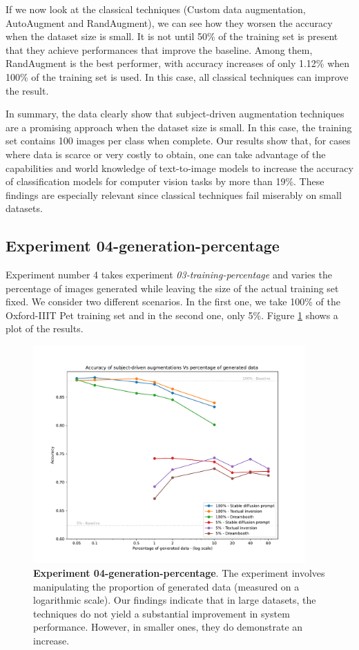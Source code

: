 If we now look at the classical techniques (Custom data augmentation, AutoAugment and RandAugment), we can see how they worsen the accuracy when the dataset size is small. It is not until 50\% of the training set is present that they achieve performances that improve the baseline. Among them, RandAugment is the best performer, with accuracy increases of only 1.12\% when 100\% of the training set is used. In this case, all classical techniques can improve the result.

In summary, the data clearly show that subject-driven augmentation techniques are a promising approach when the dataset size is small. In this case, the training set contains 100 images per class when complete. Our results show that, for cases where data is scarce or very costly to obtain, one can take advantage of the capabilities and world knowledge of text-to-image models to increase the accuracy of classification models for computer vision tasks by more than 19\%. These findings are especially relevant since classical techniques fail miserably on small datasets.

\subsection{Experiment 04-generation-percentage} \label{sec: exp-04}

Experiment number 4 takes experiment \textit{03-training-percentage} and varies the percentage of images generated while leaving the size of the actual training set fixed. We consider two different scenarios. In the first one, we take 100\% of the Oxford-IIIT Pet training set and in the second one, only 5\%. Figure \ref{fig:exp4} shows a plot of the results. 

\begin{figure}
    \centering
    \includegraphics[width=0.93\textwidth]{Pictures/experiment_004.pdf}
    \caption{\textbf{Experiment 04-generation-percentage}. The experiment involves manipulating the proportion of generated data (measured on a logarithmic scale). Our findings indicate that in large datasets, the techniques do not yield a substantial improvement in system performance. However, in smaller ones, they do demonstrate an increase.}
    \label{fig:exp4}
\end{figure}

